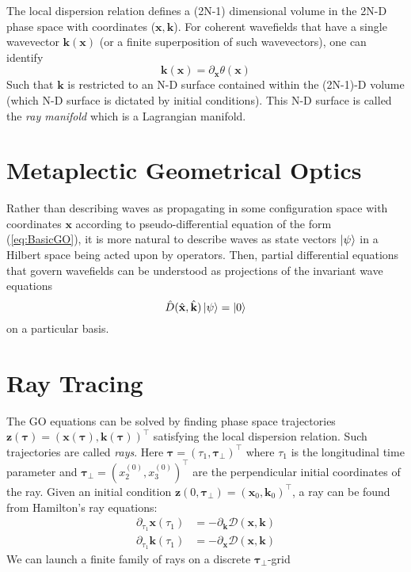 \documentclass{article}
\begin{document}
The local dispersion relation defines a (2N-1) dimensional
volume in the 2N-D phase space with coordinates ($\mathbf{x},\mathbf{k}$). For coherent wavefields that have a single wavevector $\mathbf{k}(\mathbf{x})$ (or a finite superposition of such wavevectors), one can identify
\begin{equation}
    \mathbf{k}(\mathbf{x}) = \partial_\mathbf{x}\theta(\mathbf{x})
\end{equation}
Such that $\mathbf{k} $ is restricted to an N-D surface
contained within the (2N-1)-D volume (which N-D surface is
dictated by initial conditions). This N-D surface is called
the \textit{ray manifold} which is a Lagrangian manifold.
\section{Metaplectic Geometrical Optics}
Rather than describing waves as propagating in some
configuration space with coordinates $\mathbf{x}$ according to
pseudo-differential equation of the form (\ref{eq:BasicGO}), it
is more natural to describe waves as state vectors $\ket{\psi}$
in a Hilbert space being acted upon by operators. Then, partial
differential equations that govern wavefields can be understood
as projections of the invariant wave equations 
\begin{equation}
    \hat{D}(\hat{\mathbf{x}},\hat{\mathbf{k}})\ket{\psi} = \ket{0}
\end{equation}
on a particular basis.

\section{Ray Tracing}
The GO equations can be solved by finding phase space trajectories
$\mathbf{z}(\mathbf{\tau}) = (\mathbf{x}(\mathbf{\tau}),\mathbf{k}(\mathbf{\tau}))^\intercal$ satisfying the local dispersion  relation. Such trajectories are called \textit{rays}.
Here $\mathbf{\tau} = (\tau_1,\mathbf{\tau}_\perp)^\intercal$ where $\tau_1$ is the longitudinal time parameter and $\mathbf{\tau}_\perp = (x_2^ {(0)},x_3^ {(0)})^\intercal$ are the perpendicular initial coordinates of the ray.
Given an initial condition $\mathbf{z}(0,\mathbf{\tau}_\perp) = (\mathbf{x}_0,\mathbf{k}_0)^\intercal$, a ray can be found from Hamilton's ray equations:
\begin{eqnarray}
    \partial_{\tau_1}\mathbf{x}(\tau_1) &= -\partial_{\mathbf{k}}\mathcal{D}(\mathbf{x},\mathbf{k})\\
    \partial_{\tau_1}\mathbf{k}(\tau_1) &= -\partial_{\mathbf{x}}\mathcal{D}(\mathbf{x},\mathbf{k})
\end{eqnarray}
We can launch a finite family of rays on a discrete $\mathbf{\tau}_\perp$-grid
\appendix
\end{document}
